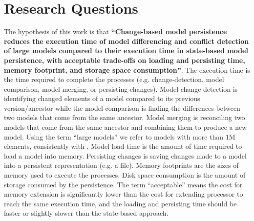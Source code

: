 \section{Research Questions}
\label{sec:research_questions}
The hypothesis of this work is that \textbf{``Change-based model persistence reduces the execution time of model differencing and conflict detection of large models compared to their execution time in state-based model persistence, with acceptable trade-offs on loading and persisting time, memory footprint, and storage space consumption''}. The execution time is the time required to complete the processes (e.g. change-detection, model comparison, model merging, or persisting changes). Model change-detection is identifying changed elements of a model compared to its previous version/ancestor while the model comparison is finding the differences between two models that come from the same ancestor. Model merging is reconciling two models that come from the same ancestor and combining them to produce a new model. Using the term ``large models'' we refer to models with more than 1M elements, consistently with \cite{daniel2016neoemf,DBLP:conf/models/Espinazo-PaganCM11}. Model load time is the amount of time required to load a model into memory. Persisting changes is saving changes made to a model into a persistent representation (e.g. a file). Memory footprints are the sizes of memory used to execute the processes. Disk space consumption is the amount of storage consumed by the persistence. The term ``acceptable'' means the cost for memory extension is significantly lower than the cost for extending processor to reach the same execution time, and the loading and persisting time should be faster or slightly slower than the state-based approach.\\

